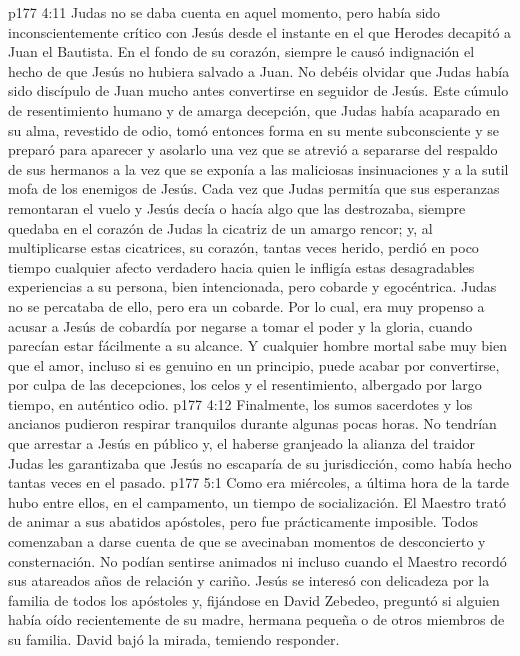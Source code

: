 \vs p177 4:11 Judas no se daba cuenta en aquel momento, pero había sido inconscientemente crítico con Jesús desde el instante en el que Herodes decapitó a Juan el Bautista. En el fondo de su corazón, siempre le causó indignación el hecho de que Jesús no hubiera salvado a Juan. No debéis olvidar que Judas había sido discípulo de Juan mucho antes convertirse en seguidor de Jesús. Este cúmulo de resentimiento humano y de amarga decepción, que Judas había acaparado en su alma, revestido de odio, tomó entonces forma en su mente subconsciente y se preparó para aparecer y asolarlo una vez que se atrevió a separarse del respaldo de sus hermanos a la vez que se exponía a las maliciosas insinuaciones y a la sutil mofa de los enemigos de Jesús. Cada vez que Judas permitía que sus esperanzas remontaran el vuelo y Jesús decía o hacía algo que las destrozaba, siempre quedaba en el corazón de Judas la cicatriz de un amargo rencor; y, al multiplicarse estas cicatrices, su corazón, tantas veces herido, perdió en poco tiempo cualquier afecto verdadero hacia quien le infligía estas desagradables experiencias a su persona, bien intencionada, pero cobarde y egocéntrica. Judas no se percataba de ello, pero era un cobarde. Por lo cual, era muy propenso a acusar a Jesús de cobardía por negarse a tomar el poder y la gloria, cuando parecían estar fácilmente a su alcance. Y cualquier hombre mortal sabe muy bien que el amor, incluso si es genuino en un principio, puede acabar por convertirse, por culpa de las decepciones, los celos y el resentimiento, albergado por largo tiempo, en auténtico odio.
\vs p177 4:12 Finalmente, los sumos sacerdotes y los ancianos pudieron respirar tranquilos durante algunas pocas horas. No tendrían que arrestar a Jesús en público y, el haberse granjeado la alianza del traidor Judas les garantizaba que Jesús no escaparía de su jurisdicción, como había hecho tantas veces en el pasado.
\vs p177 5:1 Como era miércoles, a última hora de la tarde hubo entre ellos, en el campamento, un tiempo de socialización. El Maestro trató de animar a sus abatidos apóstoles, pero fue prácticamente imposible. Todos comenzaban a darse cuenta de que se avecinaban momentos de desconcierto y consternación. No podían sentirse animados ni incluso cuando el Maestro recordó sus atareados años de relación y cariño. Jesús se interesó con delicadeza por la familia de todos los apóstoles y, fijándose en David Zebedeo, preguntó si alguien había oído recientemente de su madre, hermana pequeña o de otros miembros de su familia. David bajó la mirada, temiendo responder.
